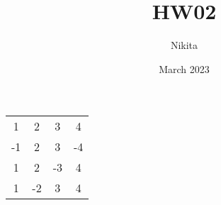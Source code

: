 \documentclass{article}
\begin{document}
\title{HW02}
\author{Nikita}
\date{March 2023}
\begin{center}
\begin{tabular}{|c|c|c|c|}
\hline
1 & 2 & 3 & 4 \\
-1 & 2 & 3 & -4 \\
1 & 2 & -3 & 4 \\
1 & -2 & 3 & 4 \\
\hline
\end{tabular}
\end{center}
\begin{center}
\end{center}
\end{document}
